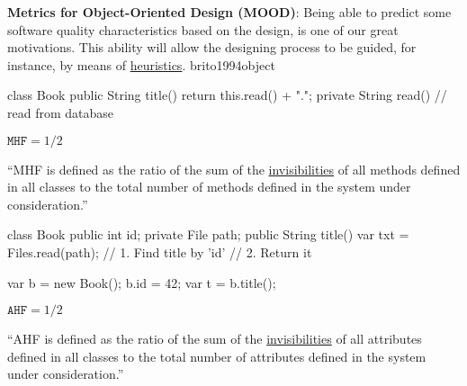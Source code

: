 \documentclass{article}
\begin{document}


  {\textbf{Metrics for Object-Oriented Design (MOOD)}: Being able to predict some software quality characteristics based on the design, is one of our great motivations. This ability will allow the designing process to be guided, for instance, by means of \ul{heuristics}.}
  {brito1994object}

\begin{multicols}{2}
{\small\begin{ffcode}
class Book {
  public String title() {
    return this.read() + ".";
  }
  private String read() {
    // read from database
  }
}
\end{ffcode}
}
\par\columnbreak\par
\(\texttt{MHF} = 1/2\)\par
``MHF is defined as the ratio of the sum of the \ul{invisibilities} of all methods
defined in all classes to the total number of methods defined in the system
under consideration.''
\end{multicols}
\plush{}

\begin{multicols}{2}
{\small\begin{ffcode}
class Book {
  public int id;
  private File path;
  public String title() {
    var txt = Files.read(path);
    // 1. Find title by 'id'
    // 2. Return it
  }
}

var b = new Book();
b.id = 42;
var t = b.title();
\end{ffcode}
}
\par\columnbreak\par
\(\texttt{AHF} = 1/2\)\par
``AHF is defined as the ratio of the sum of the \ul{invisibilities} of all attributes
defined in all classes to the total number of attributes defined in the system
under consideration.''
\end{multicols}
\plush{}
\end{document}

